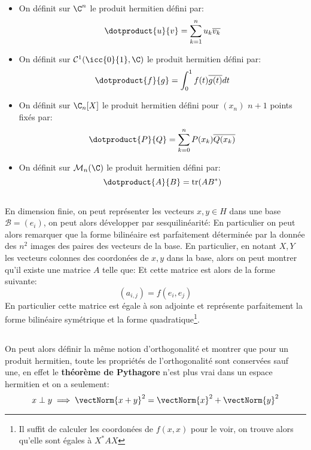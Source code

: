 \subsection*{}
\begin{itemize}
   \item On définit sur \(\C^n\) le produit hermitien défini par:
   \[
      \dotproduct{u}{v} = \sum_{k=1}^{n} u_k\overline{v_k}   
   \]
   \item On définit sur \(\mathcal{C}^1(\icc{0}{1}, \C)\) le produit hermitien défini par:
   \[
      \dotproduct{f}{g} = \int_{0}^{1} f(t)\overline{g(t)} d t    
   \]
   \item On définit sur \(\C_n[X]\) le produit hermitien défini pour \((x_n)\) \(n + 1\) points fixés par:
   \[
      \dotproduct{P}{Q} = \sum_{k=0}^{n}P(x_k)\overline{Q(x_k)}
   \]   
   \item On définit sur \(\mathcal{M}_n(\C)\) le produit hermitien défini par:
   \[
      \dotproduct{A}{B} = \text{tr}(AB^*)
   \]
\end{itemize}
\subsection*{}
En dimension finie, on peut représenter les vecteurs \(x, y \in H\) dans une base \(\mathscr{B} = (e_i)\), on peut alors développer par sesquilinéarité:
En particulier on peut alors remarquer que la forme bilinéaire est parfaitement déterminée par la donnée des \(n^2\) images des paires des vecteurs de la base. En particulier, en notant \(X, Y\) les vecteurs colonnes des coordonées de \(x, y\) dans la base, alors on peut montrer qu'il existe une matrice \(A\) telle que:
Et cette matrice est alors de la forme suivante:
\[
   (a_{i, j}) = f(e_i, e_j)
\]
En particulier cette matrice est égale à son adjointe et représente parfaitement la forme bilinéaire symétrique et la forme quadratique\footnote[1]{Il suffit de calculer les coordonées de \(f(x, x)\) pour le voir, on trouve alors qu'elle sont égales à \(X^* A X\)}.
\subsection*{}
On peut alors définir la même notion d'orthogonalité et montrer que pour un produit hermitien, toute les propriétés de l'orthogonalité sont conservées sauf une, en effet le \textbf{théorème de Pythagore} n'est plus vrai dans un espace hermitien et on a seulement:
\[
   x \perp y \implies \vectNorm{x + y}^2 = \vectNorm{x}^2 + \vectNorm{y}^2
\]
